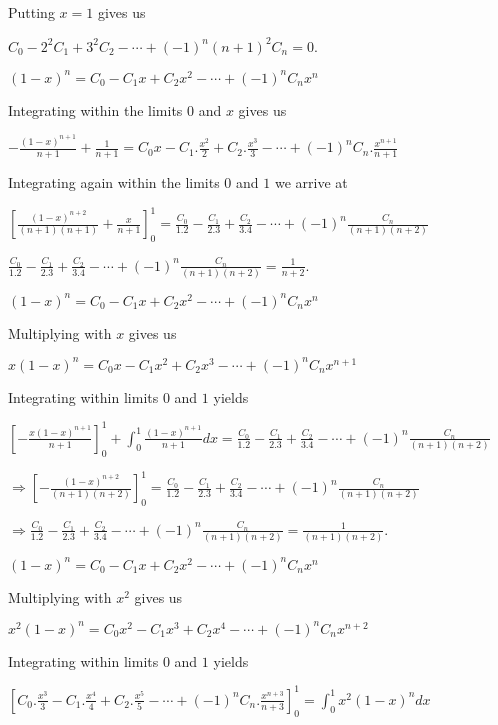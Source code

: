   Putting $x = 1$ gives us

  $C_0 - 2^2C_1 + 3^2C_2 - \cdots + (-1)^n(n + 1)^2C_n = 0$.
\item $(1 - x)^n = C_0 - C_1x + C_2x^2 - \cdots + (-1)^nC_nx^n$

  Integrating within the limits $0$ and $x$ gives us

  $-\frac{(1 - x)^{n + 1}}{n + 1} + \frac{1}{n + 1} = C_0x - C_1.\frac{x^2}{2} + C_2.\frac{x^3}{3} - \cdots
  + (-1)^nC_n.\frac{x^{n + 1}}{n + 1}$

  Integrating again within the limits $0$ and $1$ we arrive at

  $\left[\frac{(1 - x)^{n + 2}}{(n + 1)(n + 1)} + \frac{x}{n + 1}\right]_0^1 = \frac{C_0}{1.2} -
  \frac{C_1}{2.3} + \frac{C_2}{3.4} - \cdots + (-1)^n\frac{C_n}{(n + 1)(n + 2)}$

  $\frac{C_0}{1.2} - \frac{C_1}{2.3} + \frac{C_2}{3.4} - \cdots + (-1)^n\frac{C_n}{(n + 1)(n + 2)} =
  \frac{1}{n + 2}$.
\item $(1 - x)^n = C_0 - C_1x + C_2x^2 - \cdots + (-1)^nC_nx^n$

  Multiplying with $x$ gives us

  $x(1 - x)^n = C_0x - C_1x^2 + C_2x^3 - \cdots + (-1)^nC_nx^{n + 1}$

  Integrating within limits $0$ and $1$ yields

  $\left[-\frac{x(1 - x)^{n + 1}}{n + 1}\right]_0^1 + \displaystyle\int_0^1\frac{(1 - x)^{n + 1}}{n + 1}dx
    = \frac{C_0}{1.2} - \frac{C_1}{2.3} + \frac{C_2}{3.4} - \cdots + (-1)^n\frac{C_n}{(n + 1)(n + 2)}$

  $\Rightarrow \left[-\frac{(1 - x)^{n + 2}}{(n + 1)(n + 2)}\right]_0^1 = \frac{C_0}{1.2} -
  \frac{C_1}{2.3} + \frac{C_2}{3.4} - \cdots + (-1)^n\frac{C_n}{(n + 1)(n + 2)}$

  $\Rightarrow \frac{C_0}{1.2} - \frac{C_1}{2.3} + \frac{C_2}{3.4} - \cdots + (-1)^n\frac{C_n}{(n + 1)(n +
    2)} = \frac{1}{(n + 1)(n + 2)}$.
\item $(1 - x)^n = C_0 - C_1x + C_2x^2 - \cdots + (-1)^nC_nx^n$

  Multiplying with $x^2$ gives us

  $x^2(1 - x)^n = C_0x^2 - C_1x^3 + C_2x^4 - \cdots + (-1)^nC_nx^{n + 2}$

  Integrating within limits $0$ and $1$ yields

  $\left[C_0.\frac{x^3}{3} - C_1.\frac{x^4}{4} + C_2.\frac{x^5}{5} - \cdots + (-1)^nC_n.\frac{x^{n + 3}}{n +
      3}\right]_0^1 = \displaystyle\int_0^1x^2(1 - x)^ndx$

